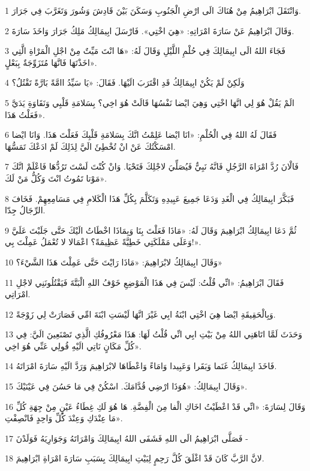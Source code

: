 \par 1 وَانْتَقَلَ ابْرَاهِيمُ مِنْ هُنَاكَ الَى ارْضِ الْجَنُوبِ وَسَكَنَ بَيْنَ قَادِشَ وَشُورَ وَتَغَرَّبَ فِي جَرَارَ.
\par 2 وَقَالَ ابْرَاهِيمُ عَنْ سَارَةَ امْرَاتِهِ: «هِيَ اخْتِي». فَارْسَلَ ابِيمَالِكُ مَلِكُ جَرَارَ وَاخَذَ سَارَةَ.
\par 3 فَجَاءَ اللهُ الَى ابِيمَالِكَ فِي حُلْمِ اللَّيْلِ وَقَالَ لَهُ: «هَا انْتَ مَيِّتٌ مِنْ اجْلِ الْمَرْاةِ الَّتِي اخَذْتَهَا فَانَّهَا مُتَزَوِّجَةٌ بِبَعْلٍ».
\par 4 وَلَكِنْ لَمْ يَكُنْ ابِيمَالِكُ قَدِ اقْتَرَبَ الَيْهَا. فَقَالَ: «يَا سَيِّدُ اامَّةً بَارَّةً تَقْتُلُ؟
\par 5 الَمْ يَقُلْ هُوَ لِي انَّهَا اخْتِي وَهِيَ ايْضا نَفْسُهَا قَالَتْ هُوَ اخِي؟ بِسَلامَةِ قَلْبِي وَنَقَاوَةِ يَدَيَّ فَعَلْتُ هَذَا».
\par 6 فَقَالَ لَهُ اللهُ فِي الْحُلْمِ: «انَا ايْضا عَلِمْتُ انَّكَ بِسَلامَةِ قَلْبِكَ فَعَلْتَ هَذَا. وَانَا ايْضا امْسَكْتُكَ عَنْ انْ تُخْطِئَ الَيَّ لِذَلِكَ لَمْ ادَعْكَ تَمَسُّهَا.
\par 7 فَالْانَ رُدَّ امْرَاةَ الرَّجُلِ فَانَّهُ نَبِيٌّ فَيُصَلِّيَ لاجْلِكَ فَتَحْيَا. وَانْ كُنْتَ لَسْتَ تَرُدُّهَا فَاعْلَمْ انَّكَ مَوْتا تَمُوتُ انْتَ وَكُلُّ مَنْ لَكَ».
\par 8 فَبَكَّرَ ابِيمَالِكُ فِي الْغَدِ وَدَعَا جَمِيعَ عَبِيدِهِ وَتَكَلَّمَ بِكُلِّ هَذَا الْكَلامِ فِي مَسَامِعِهِمْ. فَخَافَ الرِّجَالُ جِدّا.
\par 9 ثُمَّ دَعَا ابِيمَالِكُ ابْرَاهِيمَ وَقَالَ لَهُ: «مَاذَا فَعَلْتَ بِنَا وَبِمَاذَا اخْطَاتُ الَيْكَ حَتَّى جَلَبْتَ عَلَيَّ وَعَلَى مَمْلَكَتِي خَطِيَّةً عَظِيمَةً؟ اعْمَالا لا تُعْمَلُ عَمِلْتَ بِي!».
\par 10 وَقَالَ ابِيمَالِكُ لابْرَاهِيمَ: «مَاذَا رَايْتَ حَتَّى عَمِلْتَ هَذَا الشَّيْءَ؟»
\par 11 فَقَالَ ابْرَاهِيمُ: «انِّي قُلْتُ: لَيْسَ فِي هَذَا الْمَوْضِعِ خَوْفُ اللهِ الْبَتَّةَ فَيَقْتُلُونَنِي لاجْلِ امْرَاتِي.
\par 12 وَبِالْحَقِيقَةِ ايْضا هِيَ اخْتِي ابْنَةُ ابِي غَيْرَ انَّهَا لَيْسَتِ ابْنَةَ امِّي فَصَارَتْ لِي زَوْجَةً.
\par 13 وَحَدَثَ لَمَّا اتَاهَنِي اللهُ مِنْ بَيْتِ ابِي انِّي قُلْتُ لَهَا: هَذَا مَعْرُوفُكِ الَّذِي تَصْنَعِينَ الَيَّ: فِي كُلِّ مَكَانٍ نَاتِي الَيْهِ قُولِي عَنِّي هُوَ اخِي».
\par 14 فَاخَذَ ابِيمَالِكُ غَنَما وَبَقَرا وَعَبِيدا وَامَاءً وَاعْطَاهَا لابْرَاهِيمَ وَرَدَّ الَيْهِ سَارَةَ امْرَاتَهُ.
\par 15 وَقَالَ ابِيمَالِكُ: «هُوَذَا ارْضِي قُدَّامَكَ. اسْكُنْ فِي مَا حَسُنَ فِي عَيْنَيْكَ».
\par 16 وَقَالَ لِسَارَةَ: «انِّي قَدْ اعْطَيْتُ اخَاكِ الْفا مِنَ الْفِضَّةِ. هَا هُوَ لَكِ غِطَاءُ عَيْنٍ مِنْ جِهَةِ كُلِّ مَا عِنْدَكِ وَعِنْدَ كُلِّ وَاحِدٍ فَانْصِفْتِ».
\par 17 فَصَلَّى ابْرَاهِيمُ الَى اللهِ فَشَفَى اللهُ ابِيمَالِكَ وَامْرَاتَهُ وَجَوَارِيَهُ فَوَلَدْنَ -
\par 18 لانَّ الرَّبَّ كَانَ قَدْ اغْلَقَ كُلَّ رَحِمٍ لِبَيْتِ ابِيمَالِكَ بِسَبَبِ سَارَةَ امْرَاةِ ابْرَاهِيمَ.


